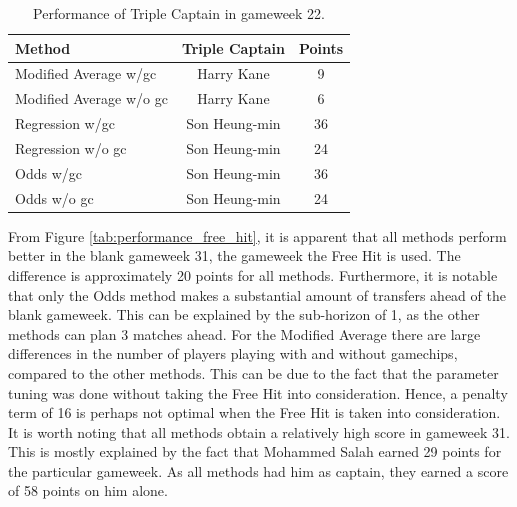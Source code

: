 \begin{table}[H]
\centering
\begin{tabular}{@{}lcc@{}}
\toprule
                 Method       & Triple Captain & Points \\ \midrule
Modified Average w/gc   & Harry Kane           & 9      \\
Modified Average w/o gc & Harry Kane           & 6      \\
Regression w/gc         & Son Heung-min            & 36     \\
Regression w/o gc       & Son Heung-min            & 24     \\
Odds w/gc               & Son Heung-min            & 36     \\
Odds w/o gc             & Son Heung-min            & 24     \\ \bottomrule
\end{tabular}
\caption{Performance of Triple Captain in gameweek 22.}
\label{tab:performance_triple_captain}
\end{table}

\newpar 

From Figure \ref{tab:performance_free_hit}, it is apparent that all methods perform better in the blank gameweek 31, the gameweek the Free Hit is used. The difference is approximately 20 points for all methods. Furthermore, it is notable that only the Odds method makes a substantial amount of transfers ahead of the blank gameweek. This can be explained by the sub-horizon of 1, as the other methods can plan 3 matches ahead. For the Modified Average there are large differences in the number of players playing with and without gamechips, compared to the other methods. 
This can be due to the fact that the parameter tuning was done without taking the Free Hit into consideration. Hence, a penalty term of 16 is perhaps not optimal when the Free Hit is taken into consideration. It is worth noting that all methods obtain a relatively high score in gameweek 31. This is mostly explained by the fact that Mohammed Salah earned 29 points for the particular gameweek. As all methods had him as captain, they earned a score of 58 points on him alone.

